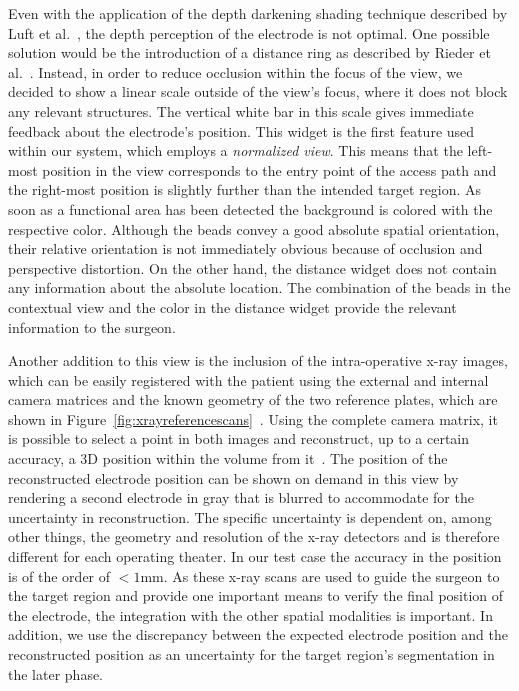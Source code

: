 \documentclass{vgtc}                          %
\begin{document}
Even with the application of the depth darkening shading technique described by Luft et al.~\cite{Luft2005}, the depth perception of the electrode is not optimal. One possible solution would be the introduction of a distance ring as described by Rieder et al.~\cite{Rieder2008}. Instead, in order to reduce occlusion within the focus of the view, we decided to show a linear scale outside of the view's focus, where it does not block any relevant structures. The vertical white bar in this scale gives immediate feedback about the electrode's position. This widget is the first feature used within our system, which employs a \emph{normalized view}. This means that the left-most position in the view corresponds to the entry point of the access path and the right-most position is slightly further than the intended target region. As soon as a functional area has been detected the background is colored with the respective color. Although the beads convey a good absolute spatial orientation, their relative orientation is not immediately obvious because of occlusion and perspective distortion. On the other hand, the distance widget does not contain any information about the absolute location. The combination of the beads in the contextual view and the color in the distance widget provide the relevant information to the surgeon.

Another addition to this view is the inclusion of the intra-operative x-ray images, which can be easily registered with the patient using the external and internal camera matrices and the known geometry of the two reference plates, which are shown in Figure~\ref{fig:xrayreferencescans}~\cite{Caprile1990,Zheng2008}. Using the complete camera matrix, it is possible to select a point in both images and reconstruct, up to a certain accuracy, a 3D position within the volume from it~\cite{Hartley2004}. The position of the reconstructed electrode position can be shown on demand in this view by rendering a second electrode in gray that is blurred to accommodate for the uncertainty in reconstruction. The specific uncertainty is dependent on, among other things, the geometry and resolution of the x-ray detectors and is therefore different for each operating theater. In our test case the accuracy in the position is of the order of $<1$mm. As these x-ray scans are used to guide the surgeon to the target region and provide one important means to verify the final position of the electrode, the integration with the other spatial modalities is important. In addition, we use the discrepancy between the expected electrode position and the reconstructed position as an uncertainty for the target region's segmentation in the later phase.
\end{document}
